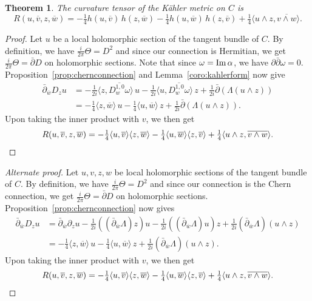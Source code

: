 \documentclass[11pt,a4paper]{amsart}
\newtheorem{theo}{Theorem}[section]
\theoremstyle{definition}
\theoremstyle{remark}
\def\Im{\mathop{\rm Im}}
\def\ov#1{\overline{#1}}
\def\d{\partial}
\def\dbar{\bar\partial}
\def\chern{D}
\def\curv{\tfrac{i}{2\pi}\Theta}
\def\kf{\omega}
\def\Lef{\Lambda}
\def\ton{u}
\def\ttw{v}
\def\tth{z}
\def\tfo{w}
\def\KC{C}
\begin{document}
\begin{theo}
The curvature tensor of the K\"{a}hler metric on $\KC$ is
\begin{equation*}
R(\ton,\ov\ttw,\tth,\ov\tfo)
= - \tfrac14 h(\ton,\ov\ttw)\, h(\tth,\ov\tfo)
- \tfrac14 h (\ton,\ov\tfo)\, h(\tth,\ov\ttw)
+ \tfrac14 \langle \ton \wedge \tth, \ov{\ttw\wedge\tfo} \rangle.
\end{equation*}
\end{theo}


\begin{proof}
Let $\ton$ be a local holomorphic section of the tangent bundle of $\KC$.
By definition, we have $\curv = \chern^2$ and since our connection is
Hermitian, we get $\curv = \dbar \chern$ on holomorphic sections.
Note that since $\kf = \Im \alpha$, we have $\d\dbar \kf = 0$.
Proposition~\ref{prop:chernconnection} and
Lemma~\ref{coro:kahlerform} now give
\begin{align*}
\dbar_{\ov\tfo} \chern_{\tth} \ton
&=
- \tfrac{1}{2i} \langle \tth,\ov{\chern^{1,0}_{\tfo}\kf} \rangle\, \ton
- \tfrac{1}{2i} \langle \ton, \ov{\chern^{1,0}_{\tfo}\kf} \rangle\, \tth
+ \tfrac{1}{2i} \dbar(\Lambda(\ton \wedge \tth))
\\
&=
- \tfrac{1}{4} \langle \tth,\ov{\tfo} \rangle\, \ton
- \tfrac{1}{4} \langle \ton, \ov{\tfo} \rangle\, \tth
+ \tfrac{1}{2i} \dbar(\Lambda(\ton \wedge \tth)).
\end{align*}
Upon taking the inner product with $\ttw$, we then get
$$
R(\ton,\ov\ttw,\tth,\ov\tfo)
= -\tfrac14
\langle \ton, \ov\ttw \rangle
\langle \tth,\ov{\tfo} \rangle
-\tfrac14
\langle \ton, \ov{\tfo} \rangle
\langle \tth, \ov\ttw \rangle
+ \tfrac{1}{4} \langle \ton \wedge \tth, \ov{\ttw \wedge \tfo}\rangle.
\qedhere
$$
\end{proof}


\begin{proof}[Alternate proof]
Let $\ton,\ttw,\tth,\tfo$ be local holomorphic sections of the tangent
bundle of $\KC$.  By definition, we have $\curv = \chern^2$ and since
our connection is the Chern connection, we get $\curv = \dbar \chern$ on
holomorphic sections. Proposition~\ref{prop:chernconnection} now gives
\begin{align*}
\dbar_{\ov\tfo} \chern_{\tth} \ton
&=
\dbar_{\ov\tfo} \d_{\tth}\ton
- \tfrac{1}{2i} ((\dbar_{\ov\tfo}\Lef) \tth)\ton
- \tfrac{1}{2i} ((\dbar_{\ov\tfo}\Lef) \ton)\tth
+ \tfrac{1}{2i} (\dbar_{\ov\tfo}\Lef)(\ton\wedge\tth)
\\
&=
- \tfrac{1}{4} \langle \tth,\ov{\tfo} \rangle\, \ton
- \tfrac{1}{4} \langle \ton, \ov{\tfo} \rangle\, \tth
+ \tfrac{1}{2i} (\dbar_{\ov\tfo}\Lef)(\ton \wedge \tth).
\end{align*}
Upon taking the inner product with $\ttw$, we then get
$$
R(\ton,\ov\ttw,\tth,\ov\tfo)
= -\tfrac14
\langle \ton, \ov\ttw \rangle
\langle \tth,\ov{\tfo} \rangle
-\tfrac14
\langle \ton, \ov{\tfo} \rangle
\langle \tth, \ov\ttw \rangle
+ \tfrac{1}{4} \langle \ton \wedge \tth, \ov{\ttw \wedge \tfo}\rangle.
\qedhere
$$
\end{proof}






\end{document}
